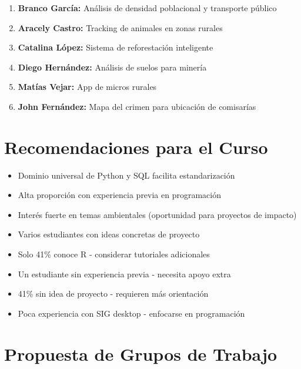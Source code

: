 \documentclass[11pt,a4paper]{article}
\begin{document}
\begin{enumerate}
    \item \textbf{Branco García:} Análisis de densidad poblacional y transporte público
    \item \textbf{Aracely Castro:} Tracking de animales en zonas rurales
    \item \textbf{Catalina López:} Sistema de reforestación inteligente
    \item \textbf{Diego Hernández:} Análisis de suelos para minería
    \item \textbf{Matías Vejar:} App de micros rurales
    \item \textbf{John Fernández:} Mapa del crimen para ubicación de comisarías
\end{enumerate}

\section{Recomendaciones para el Curso}

\begin{tcolorbox}[colback=green!5,colframe=darkgreen,title=Fortalezas del Grupo]
\begin{itemize}
    \item Dominio universal de Python y SQL facilita estandarización
    \item Alta proporción con experiencia previa en programación
    \item Interés fuerte en temas ambientales (oportunidad para proyectos de impacto)
    \item Varios estudiantes con ideas concretas de proyecto
\end{itemize}
\end{tcolorbox}

\begin{tcolorbox}[colback=yellow!5,colframe=darkorange,title=Áreas de Atención]
\begin{itemize}
    \item Solo 41\% conoce R - considerar tutoriales adicionales
    \item Un estudiante sin experiencia previa - necesita apoyo extra
    \item 41\% sin idea de proyecto - requieren más orientación
    \item Poca experiencia con SIG desktop - enfocarse en programación
\end{itemize}
\end{tcolorbox}

\section{Propuesta de Grupos de Trabajo}
\end{document}
